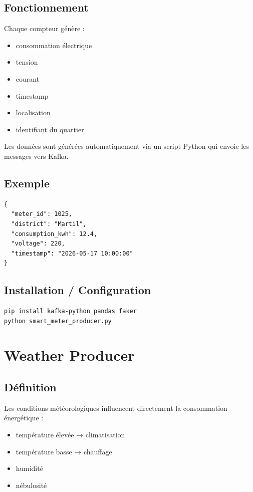 \documentclass[1pt,a4paper]{report}
\begin{document}
\subsection{Fonctionnement}

Chaque compteur génère :

\begin{itemize}
    \item consommation électrique
    \item tension
    \item courant
    \item timestamp
    \item localisation
    \item identifiant du quartier
\end{itemize}

Les données sont générées automatiquement via un script Python qui envoie les messages vers Kafka.

\subsection{Exemple}

\begin{verbatim}
{
  "meter_id": 1025,
  "district": "Martil",
  "consumption_kwh": 12.4,
  "voltage": 220,
  "timestamp": "2026-05-17 10:00:00"
}
\end{verbatim}

\subsection{Installation / Configuration}

\begin{verbatim}
pip install kafka-python pandas faker
python smart_meter_producer.py
\end{verbatim}

\section{Weather Producer}

\subsection{Définition}

Les conditions météorologiques influencent directement la consommation énergétique :

\begin{itemize}
    \item température élevée → climatisation
    \item température basse → chauffage
    \item humidité
    \item nébulosité
\end{itemize}
\end{document}
